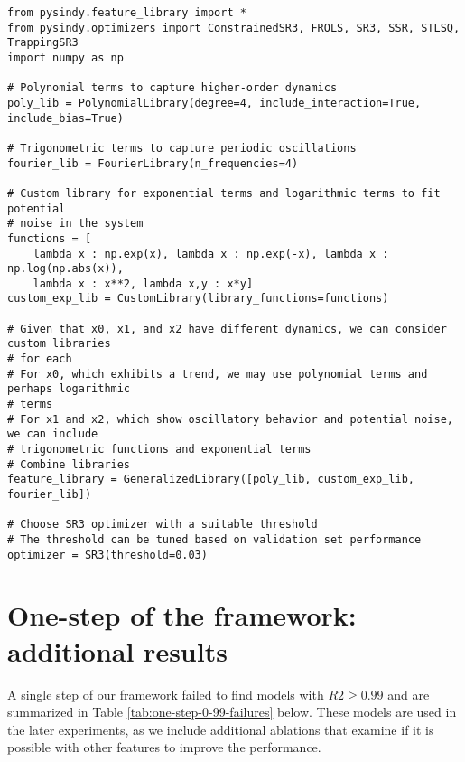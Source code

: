 \documentclass{article}
\begin{document}
{\small
\begin{verbatim}
from pysindy.feature_library import *
from pysindy.optimizers import ConstrainedSR3, FROLS, SR3, SSR, STLSQ, TrappingSR3
import numpy as np

# Polynomial terms to capture higher-order dynamics
poly_lib = PolynomialLibrary(degree=4, include_interaction=True, include_bias=True)

# Trigonometric terms to capture periodic oscillations
fourier_lib = FourierLibrary(n_frequencies=4)

# Custom library for exponential terms and logarithmic terms to fit potential 
# noise in the system
functions = [
    lambda x : np.exp(x), lambda x : np.exp(-x), lambda x : np.log(np.abs(x)), 
    lambda x : x**2, lambda x,y : x*y]
custom_exp_lib = CustomLibrary(library_functions=functions)

# Given that x0, x1, and x2 have different dynamics, we can consider custom libraries 
# for each
# For x0, which exhibits a trend, we may use polynomial terms and perhaps logarithmic 
# terms
# For x1 and x2, which show oscillatory behavior and potential noise, we can include 
# trigonometric functions and exponential terms
# Combine libraries
feature_library = GeneralizedLibrary([poly_lib, custom_exp_lib, fourier_lib])

# Choose SR3 optimizer with a suitable threshold
# The threshold can be tuned based on validation set performance
optimizer = SR3(threshold=0.03)
\end{verbatim}
}

\newpage

\section{One-step of the framework: additional results}\label{app:one-step-additional}

A single step of our framework failed to find models with $R2\geq 0.99$ and are summarized in Table \ref{tab:one-step-0-99-failures} below. 
These models are used in the later experiments, as we include additional ablations that examine if it is possible with other features to improve the performance.
\end{document}
